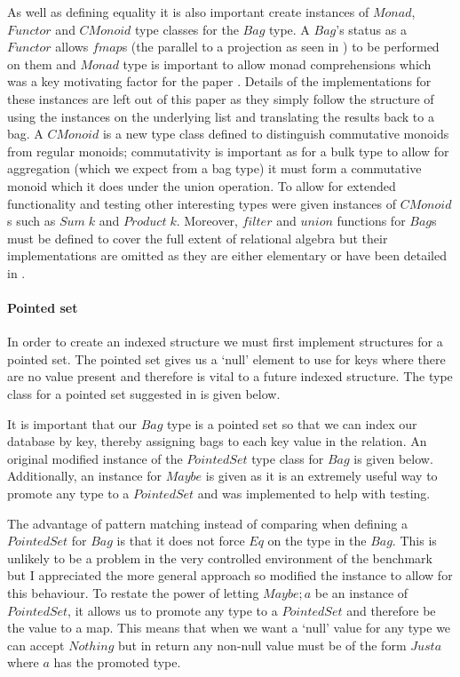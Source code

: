 As well as defining equality it is also important create instances of $Monad$,
$Functor$ and $CMonoid$ type classes for the $Bag$ type. A $Bag$'s status as a
$Functor$ allows $fmap$s
(the parallel to a projection as seen in ) to be performed on
them and $Monad$ type is important to allow monad comprehensions which was a key
motivating factor for the paper \relalg{}. Details of the implementations for these instances are
left out of this paper as they simply follow the structure of using the instances on
the underlying list and translating the results back to a bag. A $CMonoid$ is a new type class
defined to distinguish commutative monoids from regular monoids; commutativity
is important as for a bulk type to allow for aggregation (which we expect from a
bag type) it must form a commutative monoid which it does under the union
operation. To allow for extended functionality and testing other interesting
types were given instances of $CMonoid$s such as $Sum\;k$ and $Product\;k$.
Moreover, $filter$
and $union$ functions for $Bag$s must be defined to cover the full extent of
relational algebra but their implementations are omitted as they are either
elementary or have been detailed in \relalg{}.

\paragraph{Pointed set} In order to create an indexed structure we must first
implement structures for a pointed set. The pointed set gives us a `null'
element to use for keys where there are no value present and therefore is vital
to a future indexed structure. The type class for a pointed set suggested in
\relalg{} is given below.



\noindent
It is important that our $Bag$ type is a pointed set so that we can index our
database by key, thereby assigning bags to each key value in the relation. An
original modified instance of the $PointedSet$ type class for $Bag$ is given
below. Additionally, an instance for $Maybe$ is given as it is an extremely
useful way to promote any type to a $PointedSet$ and was implemented to help
with testing.



\noindent
The advantage of pattern matching instead of comparing when defining a
$PointedSet$ for $Bag$ is that it does not force $Eq$ on the type in the $Bag$.
This is unlikely to be a problem in the very controlled environment of the
benchmark but I appreciated the more general approach so modified the instance
to allow for this behaviour. To restate the power of letting $Maybe;a$ be an
instance of $PointedSet$, it allows us to promote any type to a $PointedSet$ and
therefore be the value to a map. This means that when we want a `null' value for
any type we can accept $Nothing$ but in return any non-null value must be of the
form $Just a$ where $a$ has the promoted type.
